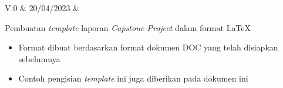 {V.0}					&	%
{20/04/2023}			&	%
{\noindent					%
Pembuatan \textit{template} laporan \textit{Capstone Project} dalam format LaTeX
\begin{itemize}
	\item Format dibuat berdasarkan format dokumen DOC yang telah disiapkan sebelumnya
	\item Contoh pengisian \textit{template} ini juga diberikan pada dokumen ini
\end{itemize}
}